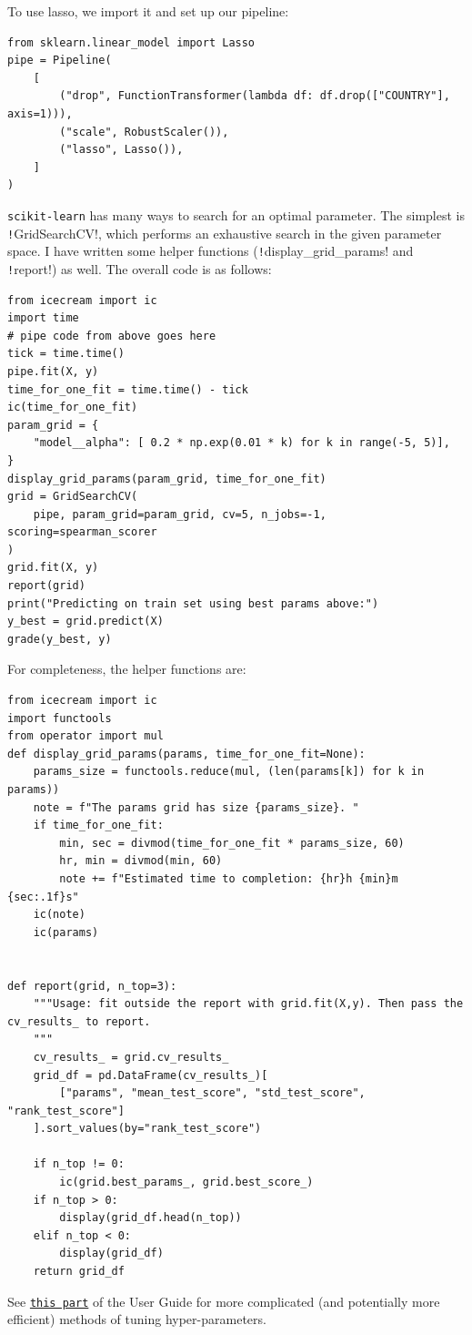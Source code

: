 \documentclass[11pt]{article}
\theoremstyle{definition}
\newcommand{\myhref}[2]{\href{#1}{\texttt{#2}}}
\begin{document}
To use lasso, we import it and set up our pipeline:
\begin{verbatim}
from sklearn.linear_model import Lasso
pipe = Pipeline(
    [
        ("drop", FunctionTransformer(lambda df: df.drop(["COUNTRY"], axis=1))),
        ("scale", RobustScaler()),
        ("lasso", Lasso()),
    ]
)
\end{verbatim}
\texttt{scikit-learn} has many ways to search for an optimal parameter. The simplest is \texttt!GridSearchCV!, which performs an exhaustive search in the given parameter space. I have written some helper functions (\texttt!display_grid_params! and \texttt!report!) as well.
The overall code is as follows:
\begin{verbatim}
from icecream import ic
import time
# pipe code from above goes here
tick = time.time()
pipe.fit(X, y)
time_for_one_fit = time.time() - tick
ic(time_for_one_fit)
param_grid = {
    "model__alpha": [ 0.2 * np.exp(0.01 * k) for k in range(-5, 5)],
}
display_grid_params(param_grid, time_for_one_fit)
grid = GridSearchCV(
    pipe, param_grid=param_grid, cv=5, n_jobs=-1, scoring=spearman_scorer
)
grid.fit(X, y)
report(grid)
print("Predicting on train set using best params above:")
y_best = grid.predict(X)
grade(y_best, y)
\end{verbatim}
For completeness, the helper functions are:
\begin{verbatim}
from icecream import ic
import functools
from operator import mul 
def display_grid_params(params, time_for_one_fit=None):
    params_size = functools.reduce(mul, (len(params[k]) for k in params))
    note = f"The params grid has size {params_size}. "
    if time_for_one_fit:
        min, sec = divmod(time_for_one_fit * params_size, 60)
        hr, min = divmod(min, 60)
        note += f"Estimated time to completion: {hr}h {min}m {sec:.1f}s"
    ic(note)
    ic(params)


def report(grid, n_top=3):
    """Usage: fit outside the report with grid.fit(X,y). Then pass the cv_results_ to report.
    """
    cv_results_ = grid.cv_results_
    grid_df = pd.DataFrame(cv_results_)[
        ["params", "mean_test_score", "std_test_score", "rank_test_score"]
    ].sort_values(by="rank_test_score")

    if n_top != 0:
        ic(grid.best_params_, grid.best_score_)
    if n_top > 0:
        display(grid_df.head(n_top))
    elif n_top < 0:
        display(grid_df)
    return grid_df
\end{verbatim}
See \myhref{https://scikit-learn.org/stable/modules/grid_search.html}{this part} of the User Guide for more complicated (and potentially more efficient) methods of tuning hyper-parameters.
\end{document}
